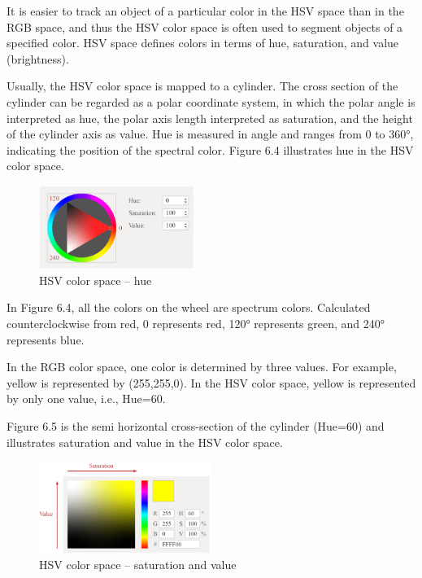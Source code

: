 \documentclass[a4paper,12pt,openany]{book}
\begin{document}
It is easier to track an object of a particular color in the HSV space than in the RGB space, and thus the HSV color space is often used to segment objects of a specified color. HSV space defines colors in terms of hue, saturation, and value (brightness).

Usually, the HSV color space is mapped to a cylinder. The cross section of the cylinder can be regarded as a polar coordinate system, in which the polar angle is interpreted as hue, the polar axis length interpreted as saturation, and the height of the cylinder axis as value. Hue is measured in angle and ranges from 0 to 360°, indicating the position of the spectral color. Figure 6.4 illustrates hue in the HSV color space.

\begin{figure}[h!]
    \centering
    \includegraphics[width=0.45\textwidth]{D6Z/6-4}
    \caption{HSV color space – hue}
\end{figure}

In Figure 6.4, all the colors on the wheel are spectrum colors. Calculated counterclockwise from red, 0 represents red, 120° represents green, and 240° represents blue.

In the RGB color space, one color is determined by three values. For example, yellow is represented by (255,255,0). In the HSV color space, yellow is represented by only one value, i.e., Hue=60.

Figure 6.5 is the semi horizontal cross-section of the cylinder (Hue=60) and illustrates saturation and value in the HSV color space.

\begin{figure}[h!]
    \centering
    \includegraphics[width=0.5\textwidth]{D6Z/6-5}
    \caption{HSV color space – saturation and value}
\end{figure}
\end{document}
